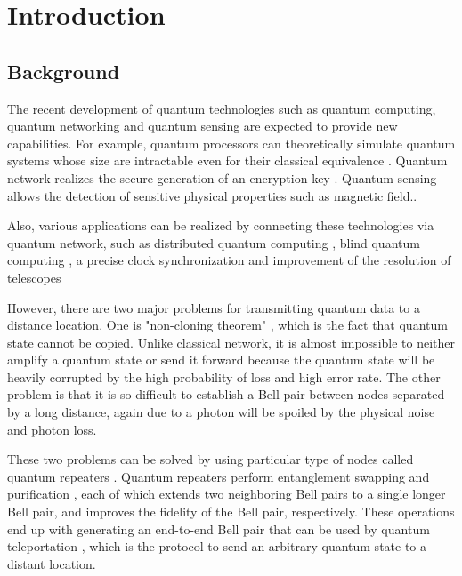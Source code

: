 \chapter{Introduction}
\label{introduction}

\section{Background}
\label{introduction:background} 

The recent development of quantum technologies such as quantum computing, quantum networking and quantum sensing are expected to provide new capabilities. 
For example, quantum processors can theoretically simulate quantum systems whose size are intractable even for their classical equivalence \cite{feynman1982simulating}.
Quantum network realizes the secure generation of an encryption key \cite{Bennett_2014} \cite{PhysRevLett.67.661}.
Quantum sensing allows the detection of sensitive physical properties such as magnetic field.\cite{pmid:12686995}.

Also, various applications can be realized by connecting these technologies via quantum network, such as distributed quantum computing \cite{Meter2016ThePT}, blind quantum computing \cite{arrighi2006blind}, a precise clock synchronization \cite{jozsa2000quantum} and improvement of the resolution of telescopes \cite{PhysRevLett.123.070504}

However, there are two major problems for transmitting quantum data to a distance location.
One is "non-cloning theorem" \cite{wootters1982single}, which is the fact that quantum state cannot be copied. Unlike classical network, it is almost impossible to neither amplify a quantum state or send it forward because the quantum state will be heavily corrupted by the high probability of loss and high error rate.
The other problem is that it is so difficult to establish a Bell pair between nodes separated by a long distance, again due to a photon will be spoiled by the physical noise and photon loss.

These two problems can be solved by using particular type of nodes called quantum repeaters \cite{PhysRevLett.81.5932}. Quantum repeaters perform entanglement swapping \cite{PhysRevLett.71.4287} and purification \cite{PhysRevA.53.2046}, each of which extends two neighboring Bell pairs to a single longer Bell pair, and improves the fidelity of the Bell pair, respectively.
These operations end up with generating an end-to-end Bell pair that can be used by quantum teleportation \cite{PhysRevLett.70.1895}, which is the protocol to send an arbitrary quantum state to a distant location. 

